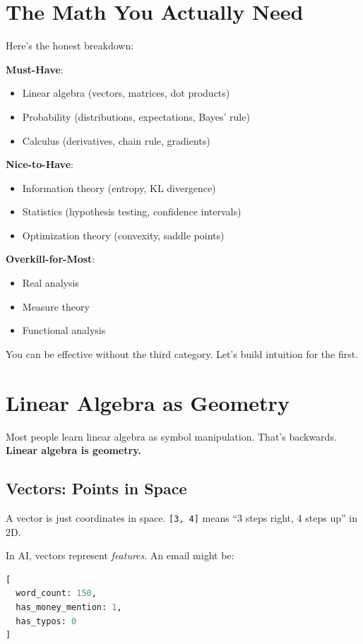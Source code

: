 \documentclass[11pt,oneside]{book}
\begin{document}
\section{The Math You Actually Need}

Here's the honest breakdown:

\textbf{Must-Have}:
\begin{itemize}
\item Linear algebra (vectors, matrices, dot products)
\item Probability (distributions, expectations, Bayes' rule)
\item Calculus (derivatives, chain rule, gradients)
\end{itemize}

\textbf{Nice-to-Have}:
\begin{itemize}
\item Information theory (entropy, KL divergence)
\item Statistics (hypothesis testing, confidence intervals)
\item Optimization theory (convexity, saddle points)
\end{itemize}

\textbf{Overkill-for-Most}:
\begin{itemize}
\item Real analysis
\item Measure theory
\item Functional analysis
\end{itemize}

You can be effective without the third category. Let's build intuition for the first.

\section{Linear Algebra as Geometry}

Most people learn linear algebra as symbol manipulation. That's backwards. \textbf{Linear algebra is geometry.}

\subsection{Vectors: Points in Space}

A vector is just coordinates in space. \texttt{[3, 4]} means ``3 steps right, 4 steps up'' in 2D.

In AI, vectors represent \textit{features}. An email might be:
\begin{lstlisting}[language=Python]
[
  word_count: 150,
  has_money_mention: 1,
  has_typos: 0
]
\end{lstlisting}
\end{document}
